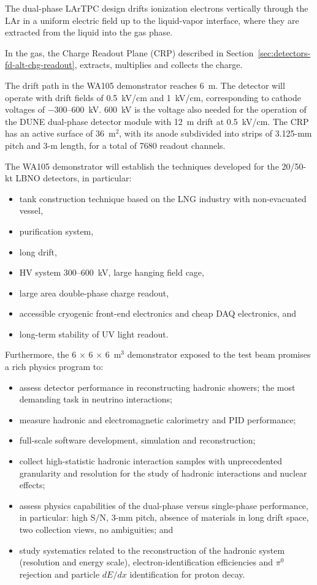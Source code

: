 {The dual-phase LArTPC design drifts ionization electrons
vertically through the LAr in a uniform electric field up to the
liquid-vapor interface, where they are extracted from the liquid into
the gas phase.

In the gas, the Charge Readout Plane (CRP) described in
Section~\ref{sec:detectors-fd-alt-chg-readout}, 
extracts, multiplies and collects the charge. 

The drift path in the WA105 demonstrator reaches 6~m. The detector
will operate with drift fields of 0.5~kV/cm and 1~kV/cm, corresponding
to cathode voltages of $-$300--600~kV. 600~kV is the voltage also
needed for the operation of the DUNE dual-phase detector module with 12~m drift at
0.5~kV/cm. The CRP has an active surface of 36~m$^2$, with its anode subdivided into
strips of 3.125-mm pitch and 3-m length, for a total of \num{7680}
readout channels.

The WA105 demonstrator will establish the techniques developed for
the 20/50-kt LBNO detectors, in particular:
\begin{itemize}
\item{tank construction technique based on the LNG industry with non-evacuated vessel,}
\item{purification system,}
\item{long drift,}
\item{HV system 300--600~kV, large hanging field cage,}
\item{large area double-phase charge readout,}
\item{accessible cryogenic front-end electronics and cheap DAQ electronics, and}
\item{long-term stability of UV light readout.}
\end{itemize}

Furthermore, the 6 $\times$ 6 $\times$ 6~m$^3$ demonstrator exposed to the
test beam promises a rich physics program to:
\begin{itemize}
\item{assess detector performance in reconstructing hadronic showers; the most demanding task in neutrino interactions;}
\item{measure hadronic and electromagnetic calorimetry and PID performance;}
\item{full-scale software development, simulation and reconstruction;}
\item{collect high-statistic hadronic interaction samples with unprecedented granularity and resolution for the study of hadronic interactions and nuclear effects;}
\item{assess physics capabilities of the dual-phase versus
  single-phase performance, in particular: high S/N, 3-mm pitch,
  absence of materials in long drift space, two collection views, no
  ambiguities; and}
\item{study systematics related to
  the reconstruction of the hadronic system (resolution and energy
  scale), electron-identification efficiencies and $\pi^0$ rejection and particle $dE/dx$ identification for proton decay.}
\end{itemize}



}
